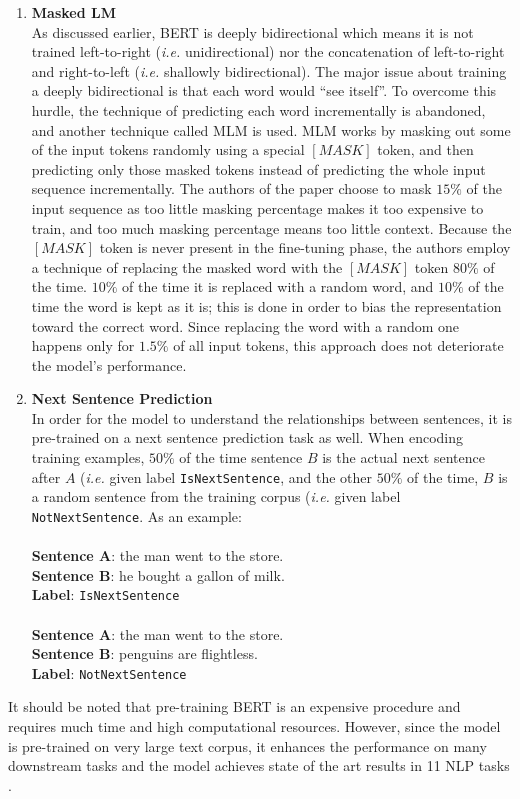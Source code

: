 \begin{enumerate}
	\item \textbf{Masked LM} \\
	As discussed earlier, \ac{BERT} is deeply bidirectional which means it is not trained left-to-right (\textit{i.e.} unidirectional) nor the concatenation of left-to-right and right-to-left (\textit{i.e.} shallowly bidirectional). The major issue about training a deeply bidirectional is that each word would \enquote{see itself}. To overcome this hurdle, the technique of predicting each word incrementally is abandoned, and another technique called \ac{MLM} is used. \ac{MLM} works by masking out some of the input tokens randomly using a special $[MASK]$ token, and then predicting only those masked tokens instead of predicting the whole input sequence incrementally. The authors of the paper choose to mask $15\%$ of the input sequence as too little masking percentage makes it too expensive to train, and too much masking percentage means too little context. Because the $[MASK]$ token is never present in the fine-tuning phase, the authors employ a technique of replacing the masked word with the $[MASK]$ token $80\%$ of the time. $10\%$ of the time it is replaced with a random word, and $10\%$ of the time the word is kept as it is; this is done in order to bias the representation toward the correct word. Since replacing the word with a random one happens only for $1.5\%$ of all input tokens, this approach does not deteriorate the model's performance.
	\item \textbf{Next Sentence Prediction} \\
	In order for the model to understand the relationships between sentences, it is pre-trained on a next sentence prediction task as well. When encoding training examples, $50\%$ of the time sentence $B$ is the actual next sentence after $A$ (\textit{i.e.} given label \texttt{IsNextSentence}, and the other $50\%$ of the time, $B$ is a random sentence from the training corpus  (\textit{i.e.} given label \texttt{NotNextSentence}.
	As an example: \\ \\
	\textbf{Sentence A}: the man went to the store. \\
	\textbf{Sentence B}: he bought a gallon of milk. \\
	\textbf{Label}: \texttt{IsNextSentence} \\ \\
	\textbf{Sentence A}: the man went to the store. \\
	\textbf{Sentence B}: penguins are flightless. \\
	\textbf{Label}: \texttt{NotNextSentence}
	
\end{enumerate}

It should be noted that pre-training \ac{BERT} is an expensive procedure and requires much time and high computational resources. However, since the model is pre-trained on very large text corpus, it enhances the performance on many downstream tasks and the model achieves state of the art results in 11 \ac{NLP} tasks \cite{devlin2018bert}.





